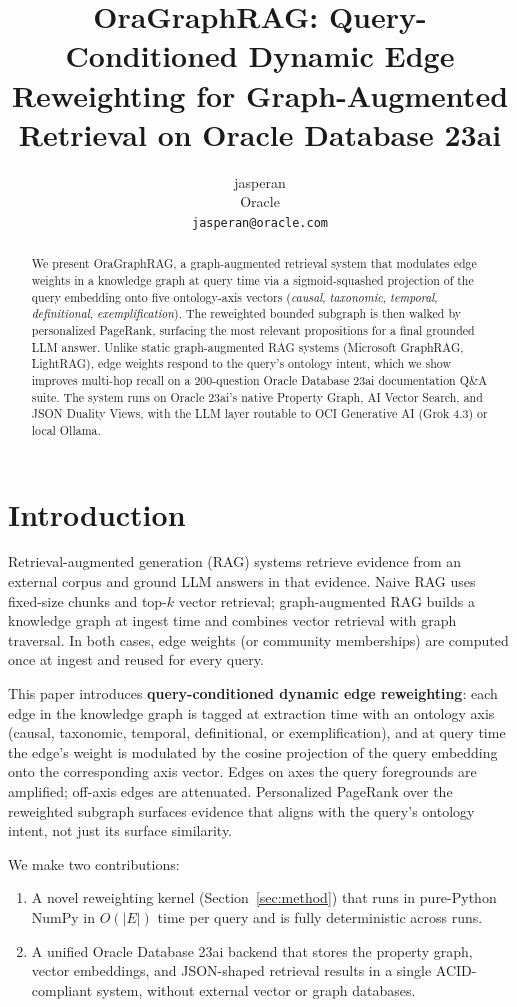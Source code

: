 \documentclass{article}
\title{OraGraphRAG: Query-Conditioned Dynamic Edge Reweighting for Graph-Augmented Retrieval on Oracle Database 23ai}
\author{%
  jasperan \\
  Oracle \\
  \texttt{jasperan@oracle.com}
}
\begin{document}
\maketitle

\begin{abstract}
We present OraGraphRAG, a graph-augmented retrieval system that modulates
edge weights in a knowledge graph at query time via a sigmoid-squashed
projection of the query embedding onto five ontology-axis vectors
(\textit{causal}, \textit{taxonomic}, \textit{temporal}, \textit{definitional},
\textit{exemplification}). The reweighted bounded subgraph is then walked by
personalized PageRank, surfacing the most relevant propositions for a final
grounded LLM answer. Unlike static graph-augmented RAG systems (Microsoft
GraphRAG, LightRAG), edge weights respond to the query's ontology intent,
which we show improves multi-hop recall on a 200-question Oracle Database
23ai documentation Q\&A suite. The system runs on Oracle 23ai's native
Property Graph, AI Vector Search, and JSON Duality Views, with the LLM
layer routable to OCI Generative AI (Grok 4.3) or local Ollama.
\end{abstract}

\section{Introduction}
\label{sec:intro}

Retrieval-augmented generation (RAG) systems retrieve evidence from an
external corpus and ground LLM answers in that evidence. Naive RAG uses
fixed-size chunks and top-$k$ vector retrieval; graph-augmented RAG
\citep{graphrag,lightrag} builds a knowledge graph at ingest time and
combines vector retrieval with graph traversal. In both cases, edge
weights (or community memberships) are computed once at ingest and reused
for every query.

This paper introduces \textbf{query-conditioned dynamic edge reweighting}:
each edge in the knowledge graph is tagged at extraction time with an
ontology axis (causal, taxonomic, temporal, definitional, or
exemplification), and at query time the edge's weight is modulated by
the cosine projection of the query embedding onto the corresponding axis
vector. Edges on axes the query foregrounds are amplified; off-axis edges
are attenuated. Personalized PageRank over the reweighted subgraph
surfaces evidence that aligns with the query's ontology intent, not just
its surface similarity.

We make two contributions:
\begin{enumerate}
  \item A novel reweighting kernel
        (Section~\ref{sec:method}) that runs in pure-Python NumPy in
        $O(|E|)$ time per query and is fully deterministic across runs.
  \item A unified Oracle Database 23ai backend that stores the property
        graph, vector embeddings, and JSON-shaped retrieval results in a
        single ACID-compliant system, without external vector or graph
        databases.
\end{enumerate}
\end{document}
